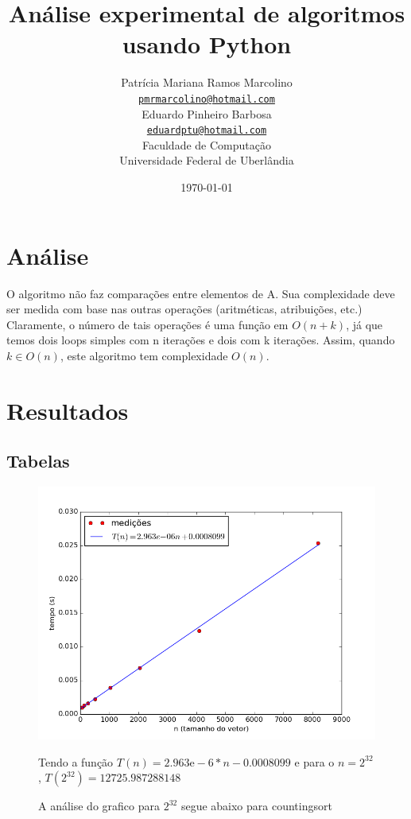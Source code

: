 \documentclass[12pt,a4paper,twoside]{report}
\title{Análise experimental de algoritmos usando Python}
\author{Patrícia Mariana Ramos Marcolino \\
\texttt{\small \url{pmrmarcolino@hotmail.com}}
\vspace{1cm} \\
Eduardo Pinheiro Barbosa \\
\texttt{\small \url{eduardptu@hotmail.com}}
\vspace{1cm} \\
Faculdade de Computação \\
Universidade Federal de Uberlândia
}
\date{\today}
\begin{document}
\maketitle
\listoffigures
\listoftables
\lstlistoflistings

\tableofcontents
\fancyhead[RE,LO]{\thesection}

\setlength{\parskip}{0.15in} %
\chapter{Análise}

O algoritmo não faz comparações entre elementos de A.
Sua complexidade deve ser medida com base nas outras
operações (aritméticas, atribuições, etc.)
Claramente, o número de tais operações é uma função em
$O(n + k)$, já que temos dois loops simples com n iterações
e dois com k iterações.
 Assim, quando $k ∈ O(n)$, este algoritmo tem complexidade
$O(n)$.


\chapter{Resultados}
\section{Tabelas}



\begin{figure}[ht]
\centering \includegraphics[scale=0.8]{../countingsort/imagens/countingsortAleatorio0.png}
\caption{A análise do grafico para $2^{32}$ segue abaixo para countingsort}

Tendo a função $T(n) = 2.963\mathrm{e}-6*n-0.0008099$ e para o $n =2^{32}$, $T(2^{32}) = 12725.987288148$ 
\label{fig:countingsortAleatorio0}
\end{figure}
\end{document}
